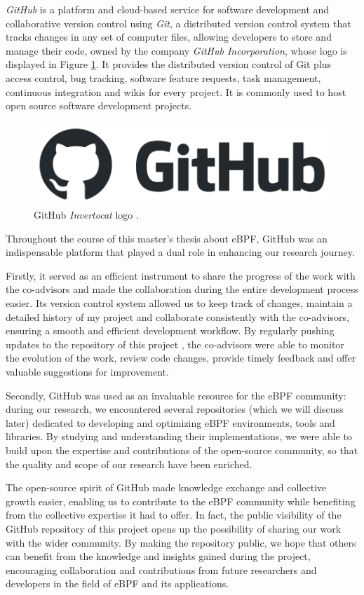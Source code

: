 \textit{GitHub} is a platform and cloud-based service for software development and collaborative version control using \textit{Git}, a distributed version control system that tracks changes in any set of computer files, allowing developers to store and manage their code, owned by the company \textit{GitHub Incorporation}, whose logo is displayed in Figure \ref{fig:GitHub_logo}.
It provides the distributed version control of Git plus access control, bug tracking, software feature requests, task management, continuous integration and wikis for every project.
It is commonly used to host open source software development projects.

\begin{figure}[h]
	\centering
	\includegraphics[width=0.7\linewidth]{images/Technologies/GitHub_logo.png}
	\caption{GitHub \textit{Invertocat} logo \cite{GitHubLogo}.}
	\label{fig:GitHub_logo}
\end{figure}

Throughout the course of this master's thesis about eBPF, GitHub was an indispensable platform that played a dual role in enhancing our research journey. 

Firstly, it served as an efficient instrument to share the progress of the work with the co-advisors and made the collaboration during the entire development process easier. 
Its version control system allowed us to keep track of changes, maintain a detailed history of my project and collaborate consistently with the co-advisors, ensuring a smooth and efficient development workflow. 
By regularly pushing updates to the repository of this project \cite{MasterThesisRepo}, the co-advisors were able to monitor the evolution of the work, review code changes, provide timely feedback and offer valuable suggestions for improvement.

Secondly, GitHub was used as an invaluable resource for the eBPF community: during our research, we encountered several repositories (which we will discuss later) dedicated to developing and optimizing eBPF environments, tools and libraries. 
By studying and understanding their implementations, we were able to build upon the expertise and contributions of the open-source community, so that the quality and scope of our research have been enriched.

The open-source spirit of GitHub made knowledge exchange and collective growth easier, enabling us to contribute to the eBPF community while benefiting from the collective expertise it had to offer.
In fact, the public visibility of the GitHub repository of this project opens up the possibility of sharing our work with the wider community. 
By making the repository public, we hope that others can benefit from the knowledge and insights gained during the project, encouraging collaboration and contributions from future researchers and developers in the field of eBPF and its applications.

